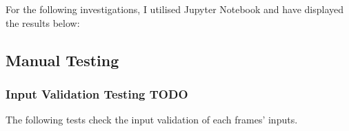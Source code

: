 \documentclass[./project-report/src/latex/project-report.tex]{subfiles}
\begin{document}
For the following investigations, I utilised Jupyter Notebook and have displayed the results below:









\subsection{Manual Testing}

\subsubsection{Input Validation Testing TODO} %

The following tests check the input validation of each frames' inputs.
\end{document}
